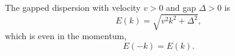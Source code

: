 \documentclass{article}
\begin{document}
The gapped dispersion with velocity $v>0$ and gap $\Delta>0$ is
\begin{equation}
E(k) = \sqrt{v^2k^2+\Delta^2} ,
\label{eq:disp}
\end{equation}
which is even in the momentum,
\begin{equation}
E(-k) = E(k) .
\label{eq:even}
\end{equation}
\end{document}
